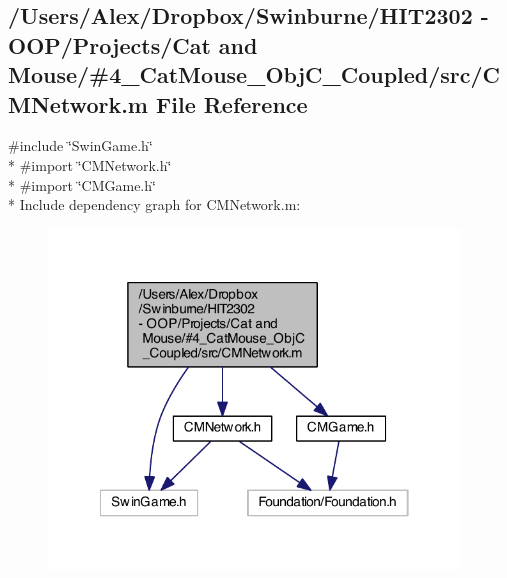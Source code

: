 \subsection{/\-Users/\-Alex/\-Dropbox/\-Swinburne/\-H\-I\-T2302 -\/ O\-O\-P/\-Projects/\-Cat and Mouse/\#4\-\_\-\-Cat\-Mouse\-\_\-\-Obj\-C\-\_\-\-Coupled/src/\-C\-M\-Network.m File Reference}
\label{_c_m_network_8m}
{\ttfamily \#include \char`\"{}Swin\-Game.\-h\char`\"{}}\\*
{\ttfamily \#import \char`\"{}C\-M\-Network.\-h\char`\"{}}\\*
{\ttfamily \#import \char`\"{}C\-M\-Game.\-h\char`\"{}}\\*
Include dependency graph for C\-M\-Network.\-m\-:
\nopagebreak
\begin{figure}[H]
\begin{center}
\leavevmode
\includegraphics[width=310pt]{_c_m_network_8m__incl}
\end{center}
\end{figure}
